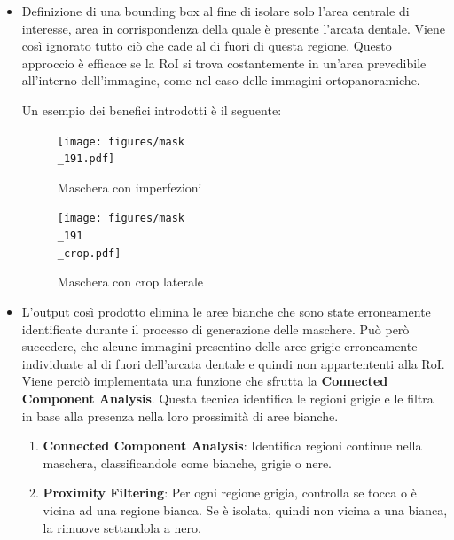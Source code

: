 \documentclass[12pt,a4paper,openright,twoside]{book}
\begin{document}
\begin{itemize}
\item Definizione di una bounding box al fine di isolare solo l'area centrale di interesse, area in corrispondenza della quale è presente l'arcata dentale. Viene così ignorato tutto ciò che cade al di fuori di questa regione. Questo approccio è efficace se la RoI si trova costantemente in un'area prevedibile all'interno dell'immagine, come nel caso delle immagini ortopanoramiche.
\begin{figure}[H]
    \centering
    
\end{figure}
Un esempio dei benefici introdotti è il seguente: 
\begin{figure}[H]
    \centering
    \begin{minipage}{0.45\textwidth}
	\centering
    	\texttt{[image: figures/mask\\\_191.pdf]}
    	\caption{Maschera con imperfezioni}
    	\label{lab:Maschera imperfetta}
    \end{minipage}\hfill
    \begin{minipage}{0.45\textwidth}
    	\centering
    	\texttt{[image: figures/mask\\\_191\\\_crop.pdf]}
    	\caption{Maschera con crop laterale}
    	\label{lab:Maschera dilatata}
    \end{minipage}\hfill
\end{figure}
\item L'output così prodotto elimina le aree bianche che sono state erroneamente identificate durante il processo di generazione delle maschere. Può però succedere, che alcune immagini presentino delle aree grigie erroneamente individuate al di fuori dell'arcata dentale e quindi non appartententi alla RoI. Viene perciò implementata una funzione che sfrutta la \textbf{Connected Component Analysis}. Questa tecnica identifica le regioni grigie e le filtra in base alla presenza nella loro prossimità di aree bianche. 
\begin{enumerate}
\item \textbf{Connected Component Analysis}: Identifica regioni continue nella maschera, classificandole come bianche, grigie o nere.
\item \textbf{Proximity Filtering}: Per ogni regione grigia, controlla se tocca o è vicina ad una regione bianca. Se è isolata, quindi non vicina a una bianca, la rimuove settandola a nero.
\end{enumerate}

\end{itemize}
\end{document}
